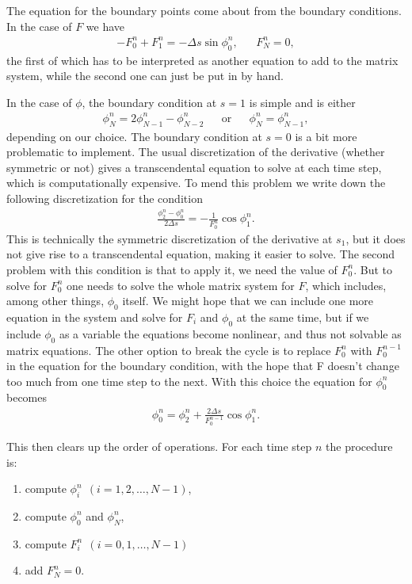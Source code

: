 \documentclass[10pt,a4paper,twocolumn]{article}
\begin{document}
The equation for the boundary points come about from the boundary conditions. In the case of $F$ we have
%
\begin{align}
    &- F_0^n + F_1^n = - \Delta s \sin \phi_0^n,& &F_N^n = 0,&
\end{align}
%
the first of which has to be interpreted as another equation to add to the matrix system, while the second one can just be put in by hand.


In the case of $\phi$, the boundary condition at $s=1$ is simple and is either
%
\begin{align}\label{eq:bc2phi}
    &\phi_N^n = 2 \phi_{N-1}^n  - \phi_{N-2}^n& &\mathrm{or}& &\phi_N^n = \phi_{N-1}^n,&
\end{align}
%
depending on our choice. The boundary condition at $s=0$ is a bit more problematic to implement. The usual discretization of the derivative (whether symmetric or not) gives a transcendental equation to solve at each time step, which is computationally expensive. To mend this problem we write down the following discretization for the condition
%
\begin{align}
    \frac{\phi_2^n - \phi_0^n}{2 \Delta s} = -\frac{1}{F_0^n} \cos \phi_1^n.
\end{align} 
%
This is technically the symmetric discretization of the derivative at $s_1$, but it does not give rise to a transcendental equation, making it easier to solve. The second problem with this condition is that to apply it, we need the value of $F_0^n$. But to solve for $F_0^n$ one needs to solve the whole matrix system for $F$, which includes, among other things, $\phi_0$ itself. We might hope that we can include one more equation in the system and solve for $F_i$ and $\phi_0$ at the same time, but if we include $\phi_0$ as a variable the equations become nonlinear, and thus not solvable as matrix equations. The other option to break the cycle is to replace $F_0^n$ with $F_0^{n-1}$ in the equation for the boundary condition, with the hope that F doesn't change too much from one time step to the next. With this choice the equation for $\phi_0^n$ becomes
%
\begin{align}
    \phi_0^n = \phi_2^n + \frac{2 \Delta s}{F_0^{n-1}} \cos \phi_1^n.
\end{align}

This then clears up the order of operations. For each time step $n$ the procedure is:
%
\begin{enumerate}
    \item compute $\phi_i^n \ \ (i=1,2,\dots,N-1)$,
    \item compute $\phi_0^n$ and $\phi_N^n$,
    \item compute $F_i^n \ \ (i=0,1,\dots,N-1)$
    \item add $F_N^n=0$.
\end{enumerate}
\end{document}
